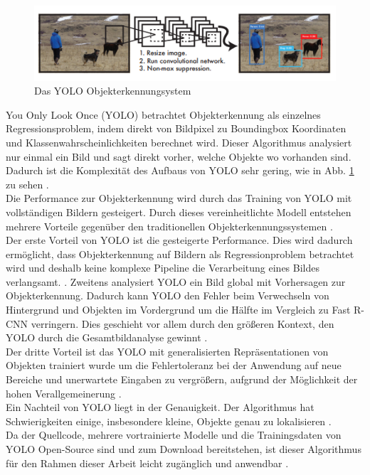 {	\begin{figure}[ht]
		\centering
		\includegraphics*[scale = 1, keepaspectratio, trim=2 2 2 2 ]{images/YOLO/YOLO_detection_system.png}
		\caption[Das YOLO Objekterkennungsystem]{Das YOLO Objekterkennungsystem \citep{Redmon2016}}
		\label{YOLO_Objectdetection}
 	\end{figure}\glqq You Only Look Once\grqq{} (YOLO) betrachtet Objekterkennung als einzelnes Regressionsproblem, indem direkt von Bildpixel zu Boundingbox Koordinaten und Klassenwahrscheinlichkeiten berechnet wird. Dieser Algorithmus analysiert nur einmal ein Bild und sagt direkt vorher, welche Objekte wo vorhanden sind. Dadurch ist die Komplexität des  Aufbaus von YOLO sehr gering, wie in Abb. \ref{YOLO_Objectdetection} zu sehen \citep{Redmon2016}. \\
	Die Performance zur Objekterkennung wird durch das Training von YOLO mit vollständigen Bildern gesteigert. Durch dieses vereinheitlichte Modell entstehen mehrere Vorteile gegenüber den traditionellen Objekterkennungssystemen \citep{Redmon2016}. \\
	Der erste Vorteil von YOLO ist die gesteigerte Performance. Dies wird dadurch ermöglicht, dass Objekterkennung auf Bildern als Regressionproblem betrachtet wird und deshalb keine komplexe Pipeline die Verarbeitung eines Bildes verlangsamt.  \citep{Redmon2016}. 
	Zweitens analysiert YOLO ein Bild global mit Vorhersagen zur Objekterkennung. Dadurch kann YOLO den Fehler beim Verwechseln von Hintergrund und Objekten im Vordergrund um die Hälfte im Vergleich zu Fast R-CNN verringern. Dies geschieht vor allem durch den größeren Kontext, den YOLO durch die Gesamtbildanalyse gewinnt \citep{Redmon2016}. \\
	Der dritte Vorteil ist das YOLO mit generalisierten Repräsentationen von Objekten trainiert wurde um die Fehlertoleranz bei der Anwendung auf neue Bereiche und unerwartete Eingaben zu vergrößern, aufgrund der Möglichkeit der hohen Verallgemeinerung \citep{Redmon2016}. \\
	Ein Nachteil von YOLO liegt in der Genauigkeit. Der Algorithmus hat Schwierigkeiten einige, insbesondere kleine, Objekte genau zu lokalisieren \citep{Redmon2016}. \\
	Da der Quellcode, mehrere vortrainierte Modelle und die Trainingsdaten von YOLO Open-Source sind und zum Download bereitstehen, ist dieser Algorithmus für den Rahmen dieser Arbeit leicht zugänglich und anwendbar \citep{Redmon2016}. \\

}
